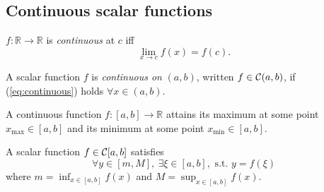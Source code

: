 
\subsection{Continuous scalar functions}
\label{sec:cont-scal-funct}

\begin{defn}
  \label{def:continuousScalarFunc}
  $f: \mathbb{R}\rightarrow \mathbb{R}$
  is \emph{continuous} at $c$
  iff
   \begin{equation}
     \label{eq:continuous}
     \lim_{x\rightarrow c} f(x) = f(c).
   \end{equation}
\end{defn}

\begin{defn}
  \label{def:continuousFuncOnR}
  A scalar function $f$ is \emph{continuous on} $(a,b)$,
     written \mbox{$f\in{\cal C}(a,b)$}, 
     if (\ref{eq:continuous}) holds  $\forall x\in (a,b)$.
\end{defn}


\begin{thm}
  \label{thm:extremeValues}
  A continuous function $f:[a,b]\rightarrow\mathbb{R}$
  attains its maximum at some point \mbox{$x_{\max}\in [a,b]$}
  and its minimum at some point $x_{\min}\in [a,b]$.
\end{thm}

\begin{thm}
  \label{thm:intermediateValue}
  A scalar function $f\in {\cal C}[a,b]$ satisfies
  \begin{equation}
    \label{eq:intermediateValue}
    \forall y\in \left[m, M \right],\ 
    \exists \xi\in[a,b], \text{ s.t. }
    y=f(\xi)
  \end{equation}
  where  $m=\inf_{x\in[a,b]} f(x)$ and
   $M=\sup_{x\in[a,b]} f(x)$.
\end{thm}


